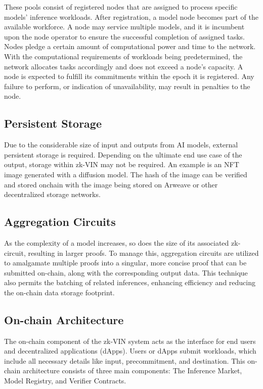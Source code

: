 \documentclass[conference]{IEEEtran}
\begin{document}
These pools consist of registered nodes that are assigned to process specific models' inference workloads. After registration, a model node becomes part of the available workforce. A node may service multiple models, and it is incumbent upon the node operator to ensure the successful completion of assigned tasks. Nodes pledge a certain amount of computational power and time to the network. With the computational requirements of workloads being predetermined, the network allocates tasks accordingly and does not exceed a node's capacity. A node is expected to fulfill its commitments within the epoch it is registered. Any failure to perform, or indication of unavailability, may result in penalties to the node.



\subsection{Persistent Storage}
Due to the considerable size of input and outputs from AI models, external persistent storage is required. Depending on the ultimate end use case of the output, storage within zk-VIN may not be required. An example is an NFT image generated with a diffusion model. The hash of the image can be verified and stored onchain with the image being stored on Arweave or other decentralized storage networks.

\subsection{Aggregation Circuits}
As the complexity of a model increases, so does the size of its associated zk-circuit, resulting in larger proofs. To manage this, aggregation circuits are utilized to amalgamate multiple proofs into a singular, more concise proof that can be submitted on-chain, along with the corresponding output data. This technique also permits the batching of related inferences, enhancing efficiency and reducing the on-chain data storage footprint.

\subsection{On-chain Architecture}
The on-chain component of the zk-VIN system acts as the interface for end users and decentralized applications (dApps).  Users or dApps submit workloads, which include all necessary details like input, precommitment, and destination. This on-chain architecture consists of three main components: The Inference Market, Model Registry, and Verifier Contracts.
\end{document}
